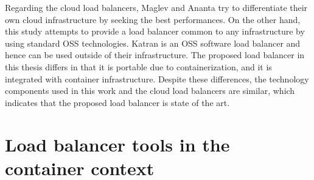 \begin{table}[h]
  \centering

  \par\bigskip
  \begin{minipage}{1.0\columnwidth}
    \caption[Cloud load balancer comparison]{
    Cloud load balancer comparison.
    }   
    \label{tabl:cloud_lb}
  \end{minipage}

  \par\bigskip
  \begin{minipage}{0.9\columnwidth}
    \label{tabl:cloud_lb}
  \end{minipage}
\end{table}

Regarding the cloud load balancers, Maglev and Ananta try to differentiate their own cloud infrastructure by seeking the best performances.
On the other hand, this study attempts to provide a load balancer common to any infrastructure by using standard OSS technologies.
Katran is an OSS software load balancer and hence can be used outside of their infrastructure.
The proposed load balancer in this thesis differs in that it is portable due to containerization, and it is integrated with container infrastructure.
Despite these differences, the technology components used in this work and the cloud load balancers are similar, which indicates that the proposed load balancer is state of the art.

\section{Load balancer tools in the container context}

